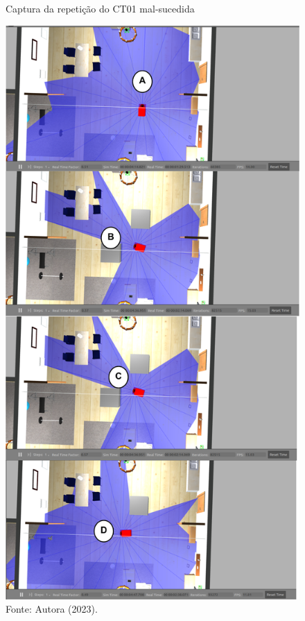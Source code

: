 \begin{figure}[p]
    \centering
    \caption{Captura da repetição do CT01 mal-sucedida }
    \includegraphics[scale=0.3]{ct01_4.png}
    \caption*{Fonte: Autora (2023).}
    \label{fig:erroCT01}
\end{figure}


